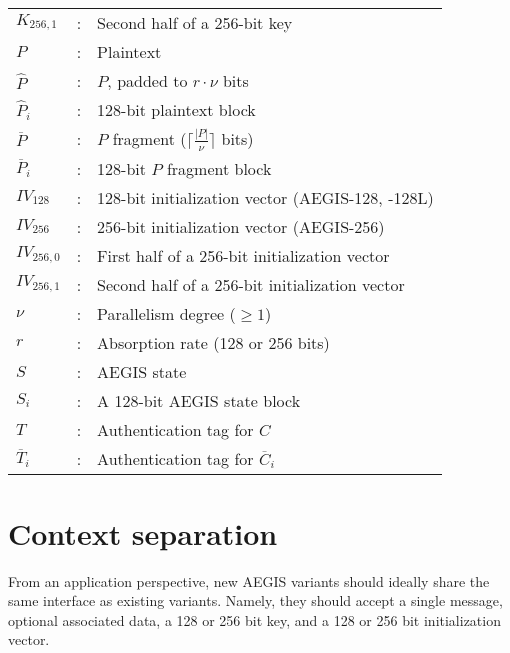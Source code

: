 \documentclass[envcountsame,runningheads,notitlepage]{llncs}
\begin{document}
\begin{tabular}{l c p{}}
  $K_{256,1}$           & : & Second half of a 256-bit key                                    \\
  $P$                   & : & Plaintext                                                       \\
  $\hat{P}$             & : & $P$, padded to $r \cdot \nu$ bits                               \\
  $\hat{P}_i$           & : & 128-bit plaintext block                                         \\
  $\overline{P}$        & : & $P$ fragment ($\lceil \frac{\lvert P \rvert}{\nu} \rceil$ bits) \\
  $\overline{P}_i$      & : & 128-bit $P$ fragment block                                      \\
  $IV_{128}$            & : & 128-bit initialization vector (AEGIS-128, -128L)                \\
  $IV_{256}$            & : & 256-bit initialization vector  (AEGIS-256)                      \\
  $IV_{256,0}$          & : & First half of a 256-bit initialization vector                   \\
  $IV_{256,1}$          & : & Second half of a 256-bit initialization vector                  \\
  $\nu$                 & : & Parallelism degree ($\geq 1$)                                   \\
  $r$                   & : & Absorption rate (128 or 256 bits)                               \\
  $S$                   & : & AEGIS state                                                     \\
  $S_i$                 & : & A 128-bit AEGIS state block                                     \\
  $T$                   & : & Authentication tag for $C$                                      \\
  $\overline{T}_i$      & : & Authentication tag for $\overline{C}_i$                         \\
\end{tabular}

\section{Context separation}
\label{sec:context separation}

From an application perspective, new AEGIS variants should ideally share the same interface as existing variants. Namely, they should accept a single message, optional associated data, a 128 or 256 bit key, and a 128 or 256 bit initialization vector.
\end{document}
